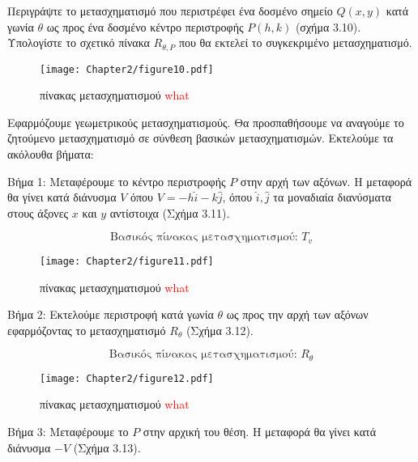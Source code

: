 \begin{example}
Περιγράψτε το μετασχηματισμό που περιστρέφει ένα δοσμένο σημείο $Q(x, y)$ κατά γωνία $\theta$ ως προς ένα δοσμένο κέντρο περιστροφής $P(h, k)$ (σχήμα 3.10). Υπολογίστε το σχετικό πίνακα $R_{\theta, P}$ που θα εκτελεί το συγκεκριμένο μετασχηματισμό.

\begin{figure}[h!]
	\begin{center}
		    \texttt{[image: Chapter2/figure10.pdf]}
	\end{center}
	\caption{πίνακας μετασχηματισμού \textcolor{red}{what}}
\end{figure}

\end{example}

\begin{solution}
	


Εφαρμόζουμε γεωμετρικούς μετασχηματισμούς. Θα προσπαθήσουμε να αναγούμε το ζητούμενο μετασχηματισμό σε σύνθεση βασικών μετασχηματισμών. Εκτελούμε τα ακόλουθα βήματα:

Βήμα 1: Μεταφέρουμε το κέντρο περιστροφής $P$ στην αρχή των αξόνων. Η μεταφορά θα γίνει κατά διάνυσμα $V$ όπου $V = -h\hat{i} - k\hat{j}$, όπου $\hat{i}, \hat{j}$ τα μοναδιαία διανύσματα στους άξονες $x$ και $y$ αντίστοιχα (Σχήμα 3.11).

\[
\text{Βασικός πίνακας μετασχηματισμού: } T_v
\]

\begin{figure}[h!]
	\begin{center}
		    \texttt{[image: Chapter2/figure11.pdf]}
	\end{center}
	\caption{πίνακας μετασχηματισμού \textcolor{red}{what}}
\end{figure}


Βήμα 2: Εκτελούμε περιστροφή κατά γωνία $\theta$ ως προς την αρχή των αξόνων εφαρμόζοντας το μετασχηματισμό $R_\theta$ (Σχήμα 3.12).

\[
\text{Βασικός πίνακας μετασχηματισμού: } R_\theta
\]

\begin{figure}[h!]
	\begin{center}
		    \texttt{[image: Chapter2/figure12.pdf]}
	\end{center}
	\caption{πίνακας μετασχηματισμού \textcolor{red}{what}}
\end{figure}


Βήμα 3: Μεταφέρουμε το $P$ στην αρχική του θέση. Η μεταφορά θα γίνει κατά διάνυσμα $-V$ (Σχήμα 3.13).


\end{solution}

